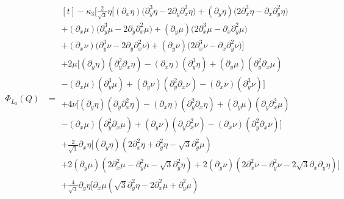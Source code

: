 \documentclass[reqno]{article}
\begin{document}
\begin{equation}
\begin{split}
	\Phi_{L_3}(Q)
	&= 
	\begin{multlined}[t]
	- \kappa_3 \Biggl[
	\tfrac{2}{\sqrt3} \eta \biggl[
	\left(\partial_x \eta\right) \bigl( \partial_y^3 \eta - 2\partial_y\partial_x^2 \eta \bigr)
	+ \left(\partial_y \eta\right) \bigl( 2 \partial_x^3 \eta - \partial_x \partial_y^2 \eta \bigr) \\
	+ \left(\partial_x \mu\right) \bigl( \partial_y^3 \mu - 2 \partial_y \partial_x^2 \mu \bigr)
	+ \left( \partial_y \mu \right) \bigl( 2\partial_x^3 \mu - \partial_x \partial_y^2 \mu \bigr) \\
	+ \left( \partial_x \nu \right) \bigl( \partial_y^3 \nu - 2 \partial_y \partial_x^2 \nu \bigr)
	+ \left(\partial_y \nu\right) \bigl( 2\partial_x^3 \nu - \partial_x \partial_y^2 \nu \bigr)
	\biggr]\\
	+ 2 \mu \biggl[
	\left(\partial_y \eta\right) \left(\partial_y^2 \partial_x \eta\right)
	- \left(\partial_x \eta\right) \left(\partial_y^3 \eta\right)
	+ \left(\partial_y \mu\right) \left(\partial_y^2 \partial_x \mu\right)\\
	- \left(\partial_x \mu\right) \left(\partial_y^3 \mu\right)
	+ \left(\partial_y \nu\right) \left(\partial_y^2 \partial_x \nu\right)
	- \left(\partial_x \nu\right) \left(\partial_y^3 \nu\right)
	\biggr] \\
	+ 4 \nu \biggl[ 
	\left(\partial_y \eta\right) \left(\partial_y \partial_x^2 \eta\right)
	- \left(\partial_x \eta\right) \left(\partial_y^2 \partial_x \eta\right)
	+ \left(\partial_y \mu\right) \left(\partial_y \partial_x^2 \mu\right)\\
	- \left(\partial_x \mu\right) \left(\partial_y^2 \partial_x \mu\right) 
	+ \left(\partial_y \nu\right) \left(\partial_y \partial_x^2 \nu\right)
	- \left(\partial_x \nu\right) \left(\partial_y^2 \partial_x \nu\right)
	\biggr] \\
	+ \tfrac{2}{\sqrt3} \partial_x \eta \biggl[
	\left(\partial_y \eta\right) \left( 2 \partial_x^2 \eta + \partial_y^2 \eta - \sqrt3 \partial_y^2 \mu \right) \\
	+ 2 \left(\partial_y \mu\right) \left( 2\partial_x^2 \mu - \partial_y^2 \mu - \sqrt3 \partial_y^2 \eta\right) 
	+ 2 \left(\partial_y \nu\right) \left( 2 \partial_x^2 \nu - \partial_y^2 \nu - 2\sqrt3 \partial_x \partial_y \eta\right) 
	\biggr] \\
	+ \tfrac{4}{\sqrt3} \partial_y \eta \biggl[
	\partial_x \mu \left( \sqrt3 \partial_y^2 \eta - 2 \partial_x^2 \mu + \partial_y^2 \mu \right)

\end{multlined}
\end{split}
\end{equation}
\end{document}
